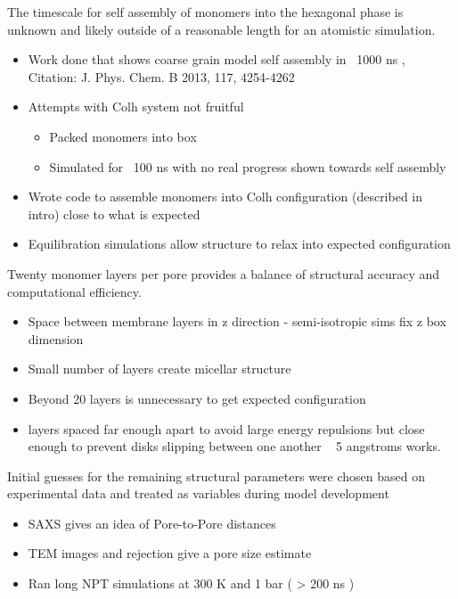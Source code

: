 \documentclass{article}
\begin{document}
	The timescale for self assembly of monomers into the hexagonal phase is unknown and likely outside of a reasonable length for an atomistic simulation. 
	\begin{itemize}
		\item Work done that shows coarse grain model self assembly in ~1000 ns , Citation: J. Phys. Chem. B 2013, 117, 4254-4262
		\item Attempts with Colh system not fruitful  
		\begin{itemize}
			\item Packed monomers into box
			\item Simulated for ~100 ns with no real progress shown towards self assembly
		\end{itemize}  
		\item Wrote code to assemble monomers into Colh configuration (described in intro) close to what is expected 
		\item Equilibration simulations allow structure to relax into expected configuration 
	\end{itemize}

	Twenty monomer layers per pore provides a balance of structural accuracy and computational efficiency. 
	\begin{itemize}
		\item Space between membrane layers in z direction - semi-isotropic sims fix z box dimension
		\item Small number of layers create micellar structure
		\item Beyond 20 layers is unnecessary to get expected configuration
		\item layers spaced far enough apart to avoid large energy repulsions but close enough to prevent disks slipping between one another ~ 5 angstroms works.
	\end{itemize}
	
	\noindent Initial guesses for the remaining structural parameters were chosen based on experimental data and treated as variables during model development 
	\begin{itemize}
		\item SAXS gives an idea of Pore-to-Pore distances
		\item TEM images and rejection give a pore size estimate
		\item Ran long NPT simulations at 300 K and 1 bar ( > 200 ns )
	\end{itemize}
	
\end{document}
